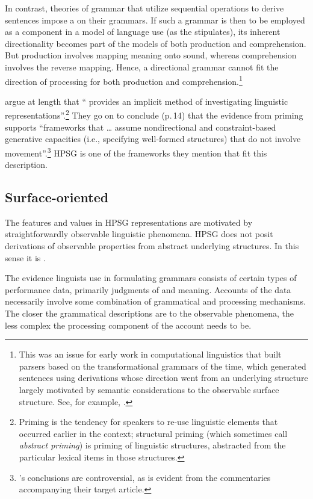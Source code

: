 \documentclass[output=paper
                ,modfonts
                ,nonflat
	        ,collection
	        ,collectionchapter
	        ,collectiontoclongg
 	        ,biblatex
                ,babelshorthands
                ,newtxmath
                ,draftmode
                ,colorlinks, citecolor=brown
]{./langsci/langscibook}
\begin{document}
In contrast, theories of grammar that utilize sequential operations to derive sentences impose a  on their grammars.  If such a grammar is then to be employed as a component in a model of language use (as the  stipulates), its inherent directionality becomes part of the models of both production and comprehension.  But production involves mapping meaning onto sound, whereas comprehension involves the reverse mapping.  Hence, a directional grammar cannot fit the direction of processing for both production and comprehension.\footnote{This was an issue for early work in computational linguistics that built parsers based on the transformational grammars of the time, which generated sentences using derivations whose direction went from an underlying structure largely motivated by semantic considerations to the observable surface structure.  See, for example, \citet{HobbsGrishman75}.}  

\citet{BraniganPickering2017} argue at length that `` provides an implicit method of investigating linguistic representations''.\footnote{Priming is the tendency for speakers to re-use linguistic elements that occurred earlier in the context; structural priming (which \citeauthor{BraniganPickering2017} sometimes call \emph{abstract priming}) is priming of linguistic structures, abstracted from the particular lexical items in those structures.}  They go on to conclude (p.\,14) that the evidence from priming supports ``frameworks that \ldots{} assume nondirectional and constraint-based generative capacities (i.e., specifying well-formed structures) that do not involve movement''.\footnote{\citeauthor{BraniganPickering2017}'s conclusions are controversial, as is evident from the commentaries accompanying their target article.}  HPSG is one of the frameworks they mention that fit this description.   

\subsection{Surface-oriented}

The features and values in HPSG representations are motivated by straightforwardly observable linguistic phenomena. HPSG does not posit derivations of observable properties from abstract
underlying structures.  In this sense it is .

The evidence linguists use in formulating grammars consists of certain types of performance data, primarily judgments of  and meaning.  Accounts of the data necessarily involve some
combination of grammatical and processing mechanisms.  The closer the grammatical descriptions are to the observable phenomena, the less complex the processing component of the account needs to be.
\end{document}
